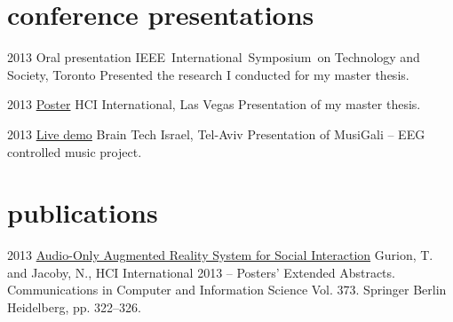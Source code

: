 \documentclass[]{friggeri-cv}  %
\begin{document}

\section{conference presentations}

\begin{entrylist}

    \entry
    {2013}
    {Oral presentation}
    {IEEE International Symposium on Technology and Society, Toronto}
    {Presented the research I conducted for my master thesis.}

\end{entrylist}
\begin{entrylist}

    \entry
    {2013}
    {\href{https://db.tt/Rx7FnAxn}{Poster}}
    {HCI International, Las Vegas}
    {Presentation of my master thesis.}

\end{entrylist}
\begin{entrylist}

    \entry
    {2013}
    {\href{http://tomgurion.blogspot.co.il/2013/10/musigali-eeg-controlled-music-for-brain.html}{Live demo}}
    {Brain Tech Israel, Tel-Aviv}
    {Presentation of MusiGali -- EEG controlled music project.}

\end{entrylist}


\section{publications}

\begin{entrylist}

    \entry
    {2013}
    {\href{http://db.tt/zpgwMFKJ}{Audio-Only Augmented Reality System for Social Interaction}}
    {}
    {Gurion, T. and Jacoby, N., HCI International 2013 -- Posters’ Extended Abstracts. Communications in Computer and Information Science Vol. 373. Springer Berlin Heidelberg, pp. 322–326.}

\end{entrylist}
\end{document}
